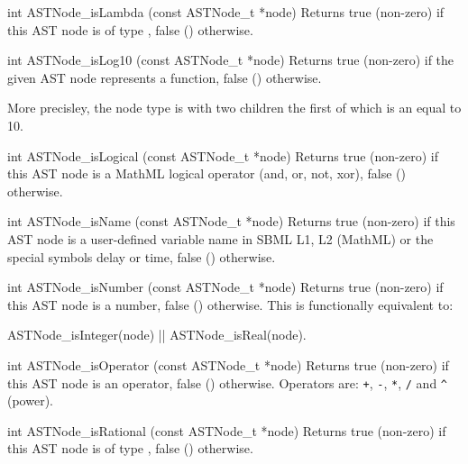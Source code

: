 \documentclass{sbmlmanual}
\begin{document}
\begin{methoddef}{int ASTNode\_isLambda (const ASTNode\_t *node)}
  Returns true (non-zero) if this AST node is of type ,
  false () otherwise.
\end{methoddef}


\begin{methoddef}{int ASTNode\_isLog10 (const ASTNode\_t *node)}
  Returns true (non-zero) if the given AST node represents a 
  function, false () otherwise.
 
  More precisley, the node type is  with two
  children the first of which is an  equal to 10.
\end{methoddef}


\begin{methoddef}{int ASTNode\_isLogical (const ASTNode\_t *node)}
  Returns true (non-zero) if this AST node is a MathML logical operator
  (and, or, not, xor), false () otherwise.
\end{methoddef}


\begin{methoddef}{int ASTNode\_isName (const ASTNode\_t *node)}
  Returns true (non-zero) if this AST node is a user-defined variable name
  in SBML L1, L2 (MathML) or the special symbols delay or time, false ()
  otherwise.
\end{methoddef}


\begin{methoddef}{int ASTNode\_isNumber (const ASTNode\_t *node)}
  Returns true (non-zero) if this AST node is a number, false ()
  otherwise.  This is functionally equivalent to:
  \begin{example}[c]
    ASTNode_isInteger(node) || ASTNode_isReal(node).
  \end{example}
\end{methoddef}


\begin{methoddef}{int ASTNode\_isOperator (const ASTNode\_t *node)}
  Returns true (non-zero) if this AST node is an operator, false ()
  otherwise.  Operators are: \verb|+|, \verb|-|, \verb|*|, \verb|/| and
  \verb|^| (power).
\end{methoddef}


\begin{methoddef}{int ASTNode\_isRational (const ASTNode\_t *node)}
  Returns true (non-zero) if this AST node is of type
  , false () otherwise.
\end{methoddef}
\end{document}
